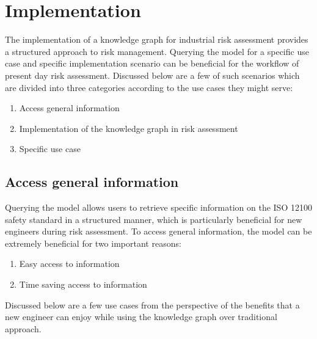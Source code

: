 \chapter{Implementation} \label{implementation}

\bigskip \bigskip 

The implementation of a knowledge graph for industrial risk assessment provides a structured approach to risk management. Querying the model for a specific use case and specific implementation scenario can be beneficial for the workflow of present day risk assessment. Discussed below are a few of such scenarios which are divided into three categories according to the use cases they might serve:

\begin{enumerate}
    \item Access general information
    \item Implementation of the knowledge graph in risk assessment
    \item Specific use case
\end{enumerate}

\section{Access general information}
Querying the model allows users to retrieve specific information on the ISO 12100 safety standard in a structured manner, which is particularly beneficial for new engineers during risk assessment. To access general information, the model can be extremely beneficial for two important reasons:

\begin{enumerate}
    \item Easy access to information
    \item Time saving access to information
\end{enumerate}

Discussed below are a few use cases from the perspective of the benefits that a new engineer can enjoy while using the knowledge graph over traditional approach.

